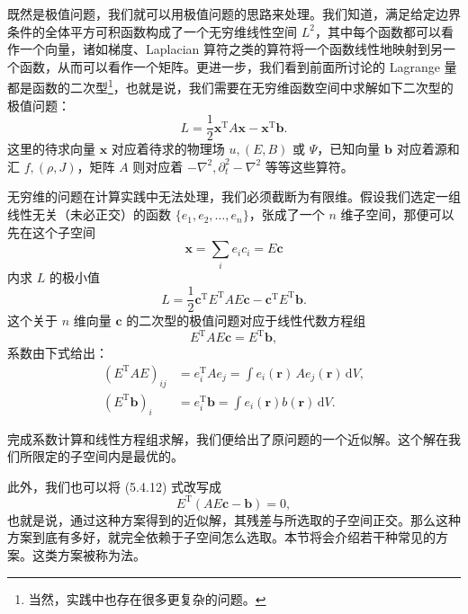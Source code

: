 既然是极值问题，我们就可以用极值问题的思路来处理。我们知道，满足给定边界条件的全体平方可积函数构成了一个无穷维线性空间 $L^2$，其中每个函数都可以看作一个向量，诸如梯度、Laplacian 算符之类的算符将一个函数线性地映射到另一个函数，从而可以看作一个矩阵。更进一步，我们看到前面所讨论的 Lagrange 量都是函数的二次型\footnote{当然，实践中也存在很多更复杂的问题。}，也就是说，我们需要在无穷维函数空间中求解如下二次型的极值问题：
\begin{equation}
L=\frac12\bm x^{\mathrm T}A\bm x-\bm x^{\mathrm T}\bm b.
\tag{5.4.9}
\end{equation}
这里的待求向量 $\bm x$ 对应着待求的物理场 $u,(E,B)$ 或 $\Psi$，已知向量 $\bm b$ 对应着源和汇 $f,(\rho,J)$，矩阵 $A$ 则对应着 $-\nabla^2,\partial_t^2-\nabla^2$ 等等这些算符。

无穷维的问题在计算实践中无法处理，我们必须截断为有限维。假设我们选定一组线性无关（未必正交）的函数 $\{e_1,e_2,\ldots,e_n\}$，张成了一个 $n$ 维子空间，那便可以先在这个子空间
\begin{equation}
\bm x=\sum_i e_i c_i=E\bm c
\tag{5.4.10}
\end{equation}
内求 $L$ 的极小值
\begin{equation}
L=\frac12\bm c^{\mathrm T}E^{\mathrm T}AE\bm c-\bm c^{\mathrm T}E^{\mathrm T}\bm b.
\tag{5.4.11}
\end{equation}
这个关于 $n$ 维向量 $\bm c$ 的二次型的极值问题对应于线性代数方程组
\begin{equation}
E^{\mathrm T}AE\bm c=E^{\mathrm T}\bm b,
\tag{5.4.12}
\end{equation}
系数由下式给出：
\begin{equation}
\begin{aligned}
(E^{\mathrm T}AE)_{ij}&=e_i^{\mathrm T}Ae_j=\int e_i(\bm r)\,A e_j(\bm r)\,\mathrm dV,\\
(E^{\mathrm T}\bm b)_i&=e_i^{\mathrm T}\bm b=\int e_i(\bm r)b(\bm r)\,\mathrm dV.
\end{aligned}
\tag{5.4.13}
\end{equation}

完成系数计算和线性方程组求解，我们便给出了原问题的一个近似解。这个解在我们所限定的子空间内是最优的。

此外，我们也可以将 (5.4.12) 式改写成
\begin{equation}
E^{\mathrm T}(AE\bm c-\bm b)=0,
\tag{5.4.14}
\end{equation}
也就是说，通过这种方案得到的近似解，其残差与所选取的子空间正交。那么这种方案到底有多好，就完全依赖于子空间怎么选取。本节将会介绍若干种常见的方案。这类方案被称为法。

